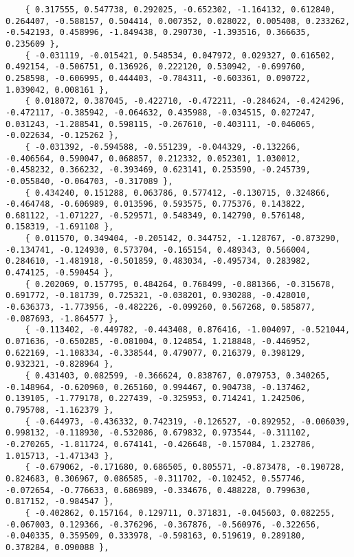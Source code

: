 \documentclass[a4paper]{article}
\begin{document}
\begin{lstlisting}
    { 0.317555, 0.547738, 0.292025, -0.652302, -1.164132, 0.612840, 0.264407, -0.588157, 0.504414, 0.007352, 0.028022, 0.005408, 0.233262, -0.542193, 0.458996, -1.849438, 0.290730, -1.393516, 0.366635, 0.235609 }, 
    { -0.031119, -0.015421, 0.548534, 0.047972, 0.029327, 0.616502, 0.492154, -0.506751, 0.136926, 0.222120, 0.530942, -0.699760, 0.258598, -0.606995, 0.444403, -0.784311, -0.603361, 0.090722, 1.039042, 0.008161 }, 
    { 0.018072, 0.387045, -0.422710, -0.472211, -0.284624, -0.424296, -0.472117, -0.385942, -0.064632, 0.435988, -0.034515, 0.027247, 0.031243, -1.288541, 0.598115, -0.267610, -0.403111, -0.046065, -0.022634, -0.125262 }, 
    { -0.031392, -0.594588, -0.551239, -0.044329, -0.132266, -0.406564, 0.590047, 0.068857, 0.212332, 0.052301, 1.030012, -0.458232, 0.366232, -0.393469, 0.623141, 0.253590, -0.245739, -0.055840, -0.064703, -0.317089 }, 
    { 0.434240, 0.151288, 0.063786, 0.577412, -0.130715, 0.324866, -0.464748, -0.606989, 0.013596, 0.593575, 0.775376, 0.143822, 0.681122, -1.071227, -0.529571, 0.548349, 0.142790, 0.576148, 0.158319, -1.691108 }, 
    { 0.011570, 0.349404, -0.205142, 0.344752, -1.128767, -0.873290, -0.134741, -0.124930, 0.573704, -0.165154, 0.489343, 0.566004, 0.284610, -1.481918, -0.501859, 0.483034, -0.495734, 0.283982, 0.474125, -0.590454 }, 
    { 0.202069, 0.157795, 0.484264, 0.768499, -0.881366, -0.315678, 0.691772, -0.181739, 0.725321, -0.038201, 0.930288, -0.428010, -0.636373, -1.773956, -0.482226, -0.099260, 0.567268, 0.585877, -0.087693, -1.864577 }, 
    { -0.113402, -0.449782, -0.443408, 0.876416, -1.004097, -0.521044, 0.071636, -0.650285, -0.081004, 0.124854, 1.218848, -0.446952, 0.622169, -1.108334, -0.338544, 0.479077, 0.216379, 0.398129, 0.932321, -0.828964 }, 
    { 0.431403, 0.082599, -0.366624, 0.838767, 0.079753, 0.340265, -0.148964, -0.620960, 0.265160, 0.994467, 0.904738, -0.137462, 0.139105, -1.779178, 0.227439, -0.325953, 0.714241, 1.242506, 0.795708, -1.162379 }, 
    { -0.644973, -0.436332, 0.742319, -0.126527, -0.892952, -0.006039, 0.998132, -0.118930, -0.532086, 0.679832, 0.973544, -0.311102, -0.270265, -1.811724, 0.674141, -0.426648, -0.157084, 1.232786, 1.015713, -1.471343 }, 
    { -0.679062, -0.171680, 0.686505, 0.805571, -0.873478, -0.190728, 0.824683, 0.306967, 0.086585, -0.311702, -0.102452, 0.557746, -0.072654, -0.776633, 0.686989, -0.334676, 0.488228, 0.799630, 0.817152, -0.984547 }, 
    { -0.402862, 0.157164, 0.129711, 0.371831, -0.045603, 0.082255, -0.067003, 0.129366, -0.376296, -0.367876, -0.560976, -0.322656, -0.040335, 0.359509, 0.333978, -0.598163, 0.519619, 0.289180, 0.378284, 0.090088 }, 

\end{lstlisting}
\end{document}
